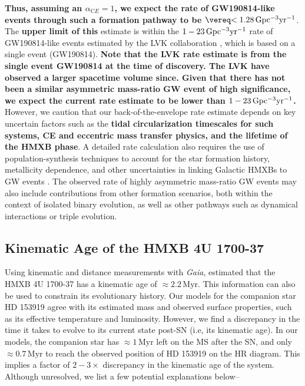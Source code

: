 \documentclass[linenumbers,trackchanges,twocolumn]{aastex701}
\begin{document}
 \textbf{Thus, assuming an $\alpha_{\mathrm CE} = 1$, we expect the rate of GW190814-like events through such a formation pathway to be $\rm \lesssim 1.28\, Gpc^{-3} yr^{-1}$}. The \textbf{upper limit of this} estimate is within the
 $\rm 1-23\, Gpc^{-3} yr^{-1}$ rate of GW190814-like events estimated
 by the LVK collaboration \citep{2020ApJ...896L..44A}, which is based on a single event (GW190814). \textbf{Note that the LVK rate estimate is from the single event GW190814 at the time of discovery. The LVK have observed a larger spacetime volume since. Given that there has not been a similar asymmetric mass-ratio GW event of high significance, we expect the current rate estimate to be lower than $\rm 1-23\, Gpc^{-3} yr^{-1}$.} However, we caution that our back-of-the-envelope rate estimate depends on key uncertain factors such as the \textbf{tidal circularization timescales for such systems, CE and eccentric mass transfer physics, and the lifetime of the HMXB phase}. A detailed rate calculation also requires the use of
 population-synthesis techniques to account for the star formation
 history, metallicity dependence, and other uncertainties in linking
 Galactic HMXBs to GW events \cite[e.g.,][]{2020ApJ...899L...1Z, 2023ApJ...953..152O, 2025arXiv251116648M}. The observed rate of highly asymmetric mass-ratio GW events may also include contributions from other formation scenarios, both within the context of isolated binary evolution, as well as other pathways such as dynamical interactions or triple evolution.

\subsection{Kinematic Age of the HMXB 4U 1700-37} \label{age}

Using kinematic and distance measurements with \emph{Gaia},
\cite{2021A&A...655A..31V} estimated that the HMXB 4U 1700-37 has a
kinematic age of $\approx 2.2\,\mathrm{Myr}$. This information can also be used to constrain its evolutionary history. Our models for the companion star HD 153919 agree with its estimated mass and observed surface properties, such as its effective temperature and luminosity. However, we find a discrepancy in the time it takes to evolve to its current state post-SN (i.e, its kinematic age). In our models, the companion star has  $\approx 1\,\mathrm{Myr}$ left on the MS after the SN, and only $\approx 0.7\,\mathrm{Myr}$ to reach the observed position of HD 153919 on the HR diagram. This implies a factor of $2-3\times$ discrepancy in the kinematic age of the system. Although unresolved, we list a few potential explanations below--
\end{document}

